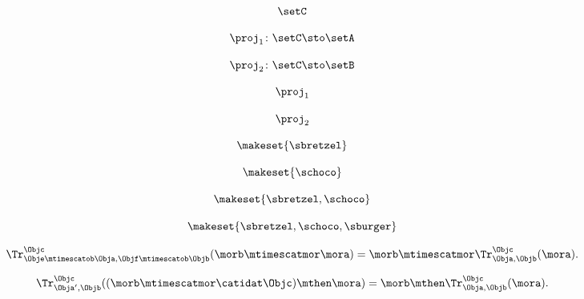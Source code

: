 {\begin{forslides}
    \begin{equation}
        \label{eq:feedback-151}
        \setC
    \end{equation}

    \begin{equation}
        \label{eq:feedback-152}
        \proj_1\colon \setC \sto \setA
    \end{equation}

    \begin{equation}
        \label{eq:feedback-153}
        \proj_2\colon \setC \sto \setB
    \end{equation}

    \begin{equation}
        \label{eq:feedback-154}
        \proj_1
    \end{equation}

    \begin{equation}
        \label{eq:feedback-155}
        \proj_2
    \end{equation}

    \begin{equation}
        \label{eq:feedback-156}
        \makeset{ \sbretzel }
    \end{equation}

    \begin{equation}
        \label{eq:feedback-157}
        \makeset{ \schoco }
    \end{equation}

    \begin{equation}
        \label{eq:feedback-158}
        \makeset{ \sbretzel, \schoco }
    \end{equation}

    \begin{equation}
        \label{eq:feedback-159}
        \makeset{ \sbretzel, \schoco, \sburger }
    \end{equation}

    \begin{equation}
        \label{eq:feedback-160}
                      \Tr_{\Obje\mtimescatob \Obja,\Objf\mtimescatob \Objb}^{\Objc}(\morb \mtimescatmor \mora)=\morb \mtimescatmor \Tr_{\Obja,\Objb}^\Objc(\mora).
    \end{equation}

    \begin{equation}
        \label{eq:feedback-161}
        \Tr_{\Obja', \Objb}^\Objc ( (\morb \mtimescatmor \catidat\Objc) \mthen \mora) = \morb \mthen \Tr_{\Obja, \Objb}^\Objc (\mora).
    \end{equation}


\end{forslides}}
